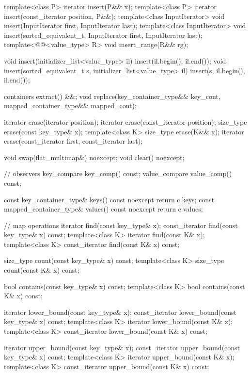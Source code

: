 \begin{codeblock}
{{    template<class P> iterator insert(P&& x);
    template<class P>
      iterator insert(const_iterator position, P&&);
    template<class InputIterator>
      void insert(InputIterator first, InputIterator last);
    template<class InputIterator>
      void insert(sorted_equivalent_t, InputIterator first, InputIterator last);
    template<@@<value_type> R>
      void insert_range(R&& rg);

    void insert(initializer_list<value_type> il)
      { insert(il.begin(), il.end()); }
    void insert(sorted_equivalent_t s, initializer_list<value_type> il)
      { insert(s, il.begin(), il.end()); }

    containers extract() &&;
    void replace(key_container_type&& key_cont, mapped_container_type&& mapped_cont);

    iterator erase(iterator position);
    iterator erase(const_iterator position);
    size_type erase(const key_type& x);
    template<class K> size_type erase(K&& x);
    iterator erase(const_iterator first, const_iterator last);

    void swap(flat_multimap&) noexcept;
    void clear() noexcept;

    // observers
    key_compare key_comp() const;
    value_compare value_comp() const;

    const key_container_type& keys() const noexcept { return c.keys; }
    const mapped_container_type& values() const noexcept { return c.values; }

    // map operations
    iterator find(const key_type& x);
    const_iterator find(const key_type& x) const;
    template<class K> iterator find(const K& x);
    template<class K> const_iterator find(const K& x) const;

    size_type count(const key_type& x) const;
    template<class K> size_type count(const K& x) const;

    bool contains(const key_type& x) const;
    template<class K> bool contains(const K& x) const;

    iterator lower_bound(const key_type& x);
    const_iterator lower_bound(const key_type& x) const;
    template<class K> iterator lower_bound(const K& x);
    template<class K> const_iterator lower_bound(const K& x) const;

    iterator upper_bound(const key_type& x);
    const_iterator upper_bound(const key_type& x) const;
    template<class K> iterator upper_bound(const K& x);
    template<class K> const_iterator upper_bound(const K& x) const;

}}
\end{codeblock}
